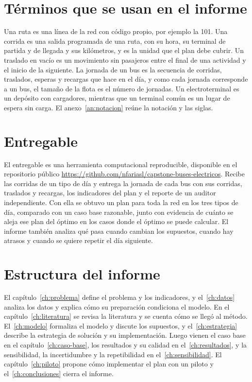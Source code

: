 \section{Términos que se usan en el informe}
\label{sec:terminos}

Una ruta es una línea de la red con código propio, por ejemplo la 101. Una corrida es una salida programada de una ruta, con su hora, su terminal de partida y de llegada y sus kilómetros, y es la unidad que el plan debe cubrir. Un traslado en vacío es un movimiento sin pasajeros entre el final de una actividad y el inicio de la siguiente. La jornada de un bus es la secuencia de corridas, traslados, esperas y recargas que hace en el día, y como cada jornada corresponde a un bus, el tamaño de la flota es el número de jornadas. Un electroterminal es un depósito con cargadores, mientras que un terminal común es un lugar de espera sin carga. El anexo~\ref{an:notacion} reúne la notación y las siglas.

\section{Entregable}
\label{sec:entregable}

El entregable es una herramienta computacional reproducible, disponible en el repositorio público \url{https://github.com/nfariasl/capstone-buses-electricos}. Recibe las corridas de un tipo de día y entrega la jornada de cada bus con sus corridas, traslados y recargas, los indicadores del plan y el reporte de un auditor independiente. Con ella se obtuvo un plan para toda la red en los tres tipos de día, comparado con un caso base razonable, junto con evidencia de cuánto se aleja ese plan del óptimo en los casos donde el óptimo se puede calcular. El informe también analiza qué pasa cuando cambian los supuestos, cuando hay atrasos y cuando se quiere repetir el día siguiente.

\section{Estructura del informe}
\label{sec:estructura}

El capítulo~\ref{ch:problema} define el problema y los indicadores, y el~\ref{ch:datos} analiza los datos y explica cómo su preparación condiciona el modelo. En el capítulo~\ref{ch:literatura} se revisa la literatura y se cuenta cómo se llegó al método. El~\ref{ch:modelo} formaliza el modelo y discute los supuestos, y el~\ref{ch:estrategia} describe la estrategia de solución y su implementación. Luego vienen el caso base en el capítulo~\ref{ch:caso-base}, los resultados y su calidad en el~\ref{ch:resultados}, y la sensibilidad, la incertidumbre y la repetibilidad en el~\ref{ch:sensibilidad}. El capítulo~\ref{ch:piloto} propone cómo implementar el plan con un piloto y el~\ref{ch:conclusiones} cierra el informe.
